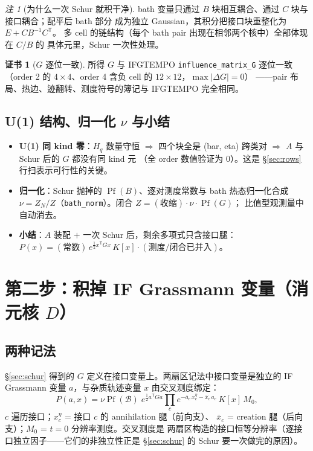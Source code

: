 \documentclass[11pt,a4paper]{ctexart}
\newcommand{\Pf}{\operatorname{Pf}}
\theoremstyle{plain}
\theoremstyle{definition}
\newtheorem{checkcert}[identity]{证书}
\theoremstyle{remark}
\newtheorem{remark}[identity]{注}
\begin{document}
\begin{remark}[为什么一次 Schur 就积干净]
bath 变量只通过 $B$ 块相互耦合、通过 $C$ 块与接口耦合；配平后 bath 部分
成为独立 Gaussian，其积分把接口块重整化为 $E + CB^{-1}C^{\mathsf T}$。
多 cell 的链结构（每个 bath pair 出现在相邻两个核中）全部体现在 $C/B$ 的
具体元里，Schur 一次性处理。
\end{remark}

\begin{checkcert}[$G$ 逐位一致]
所得 $G$ 与 IFGTEMPO \texttt{influence\_matrix\_G} 逐位一致
（order 2 的 $4\times4$、order 4 含负 cell 的 $12\times12$，$\max|\Delta G| = 0$）
——pair 布局、热边、迹翻转、测度符号的簿记与 IFGTEMPO 完全相同。
\end{checkcert}

\subsection{U(1) 结构、归一化 \texorpdfstring{$\nu$}{nu} 与小结}

\begin{itemize}
\item \textbf{U(1) 同 kind 零}：$H_q$ 数量守恒 $\Rightarrow$ 四个块全是
      (bar, eta) 跨类对 $\Rightarrow$ $A$ 与 Schur 后的 $G$ 都没有同 kind 元
      （全 order 数值验证为 0）。这是 \S\ref{sec:rows} 行扫表示可行性的关键。
\item \textbf{归一化}：Schur 抛掉的 $\Pf(B)$、逐对测度常数与 bath 热态归一化合成
      $\nu = Z_N/Z$（\texttt{bath\_norm}）。闭合 $Z = (\text{收缩})\cdot\nu\cdot\Pf(G)$；
      比值型观测量中自动消去。
\item \textbf{小结}：$A$ 装配 $+$ 一次 Schur 后，剩余多项式只含接口腿：
      $P(x) = (\text{常数})\,e^{\frac12 x^{\mathsf T}Gx}\,K[x]\cdot(\text{测度/闭合已并入})$。
\end{itemize}

\section{第二步：积掉 IF Grassmann 变量（消元核 \texorpdfstring{$D$}{D}）}

\subsection{两种记法}

\S\ref{sec:schur} 得到的 $G$ 定义在接口变量上。两扇区记法中接口变量是独立的
IF Grassmann 变量 $a$，与杂质轨迹变量 $x$ 由交叉测度绑定：
\begin{equation}
P(a,x) = \nu\Pf(\mathcal{B})\;
e^{\frac12 a^{\mathsf T} G a}
\prod_c e^{-\bar a_c\, x^{\eta}_c - \bar x^{\bar{}}_c\, a_c}\, K[x]\, M_0 ,
\label{eq:twosector}
\end{equation}
$c$ 遍历接口；$x^{\eta}_c$ = 接口 $c$ 的 annihilation 腿（前向支）、
$\bar x_c$ = creation 腿（后向支）；$M_0$ = $t{=}0$ 分辨率测度。交叉测度是
两扇区构造的接口恒等分辨率（逐接口独立因子——它们的非独立性正是
\S\ref{sec:schur} 的 Schur 要一次做完的原因）。
\end{document}
